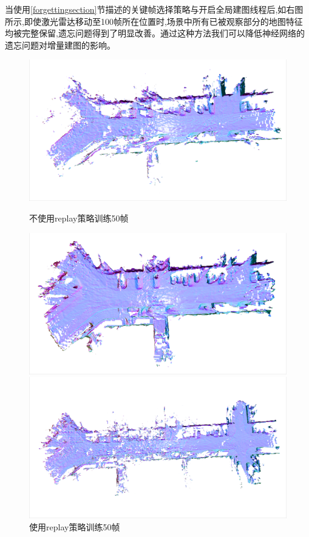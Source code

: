 当使用\ref{forgettingsection}节描述的关键帧选择策略与开启全局建图线程后,如右图所示,即使激光雷达移动至100帧所在位置时,场景中所有已被观察部分的地图特征均被完整保留,遗忘问题得到了明显改善。通过这种方法我们可以降低神经网络的遗忘问题对增量建图的影响。
\begin{figure}[htbp]
	\centering
	\begin{minipage}{0.5\linewidth}
		\centering
		\includegraphics[width=1\linewidth]{figures/50w.png}
        \caption*{不使用replay策略训练50帧}
	\end{minipage}\hfill
	\begin{minipage}{0.5\linewidth}
		\centering
		\includegraphics[width=1\linewidth]{figures/50o.png}
        \caption*{使用replay策略训练50帧}
	\end{minipage}
    \vfill
	\begin{minipage}{0.5\linewidth}
		\centering
		\includegraphics[width=1\linewidth]{figures/100w.png}

\end{minipage}
\end{figure}
